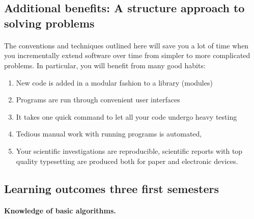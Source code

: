 \documentclass[%
twoside,                 %
final,                   %
10pt]{article}
\begin{document}
\noindent




\subsection{Additional benefits: A structure approach to solving problems}

\paragraph{}
The conventions and techniques outlined here will save you a lot of time when you incrementally extend software over time from simpler to more complicated problems. In particular, you will benefit from many good habits:
\begin{enumerate}
\item New code is added in a modular fashion to a library (modules)

\item Programs are run through convenient user interfaces

\item It takes one quick command to let all your code undergo heavy testing 

\item Tedious manual work with running programs is automated,

\item Your scientific investigations are reproducible, scientific reports with top quality typesetting are produced both for paper and electronic devices.
\end{enumerate}

\noindent






\subsection{Learning outcomes three first semesters}

\paragraph{Knowledge of basic algorithms.}
\end{document}
